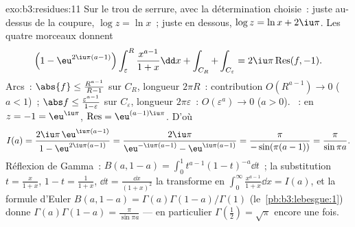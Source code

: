 \begin{solution}{exo:b3:residues:11}
Sur le trou de serrure, avec la détermination choisie~:
juste au-dessus de la coupure, $\log z = \ln x$~; juste en
dessous, $\log z = \ln x + 2\iu\pi$. Les quatre morceaux
donnent
\[
\Bigl(1 - \eu^{2\iu\pi(a-1)}\Bigr)\int_\varepsilon^R
\frac{x^{a-1}}{1+x}\dd x + \int_{C_R} + \int_{C_\varepsilon}
= 2\iu\pi\operatorname{Res}(f, -1) .
\]
Arcs~: $\abs{f} \leq \frac{R^{a-1}}{R - 1}$ sur $C_R$,
longueur $2\pi R$~: contribution $O(R^{a-1}) \to 0$ ($a <
1$)~; $\abs f \leq \frac{\varepsilon^{a-1}}{1 -
\varepsilon}$ sur $C_\varepsilon$, longueur
$2\pi\varepsilon$~: $O(\varepsilon^a) \to 0$ ($a > 0$).
~: en $z = -1 = \eu^{\iu\pi}$, $\operatorname{Res} =
\eu^{(a-1)\iu\pi}$. D'où
\[
I(a) = \frac{2\iu\pi\,\eu^{\iu\pi(a-1)}}{1 -
\eu^{2\iu\pi(a-1)}}
= \frac{2\iu\pi}{\eu^{-\iu\pi(a-1)} - \eu^{\iu\pi(a-1)}}
= \frac{\pi}{-\sin(\pi(a-1))} = \frac{\pi}{\sin\pi a} .
\]
Réflexion de Gamma~: $B(a, 1-a) =
\int_0^1t^{a-1}(1-t)^{-a}\dd t$~; la substitution $t =
\frac x{1+x}$, $1 - t = \frac1{1+x}$, $\dd t =
\frac{\dd x}{(1+x)^2}$ la transforme en $\int_0^\infty
\frac{x^{a-1}}{1+x}\dd x = I(a)$, et la formule d'Euler
$B(a, 1-a) = \Gamma(a)\Gamma(1-a)/\Gamma(1)$
(le~\cref{pb:b3:lebesgue:1}) donne
$\Gamma(a)\Gamma(1-a) = \frac\pi{\sin\pi a}$ --- en
particulier $\Gamma(\tfrac12) = \sqrt\pi$ encore une fois.
\end{solution}

